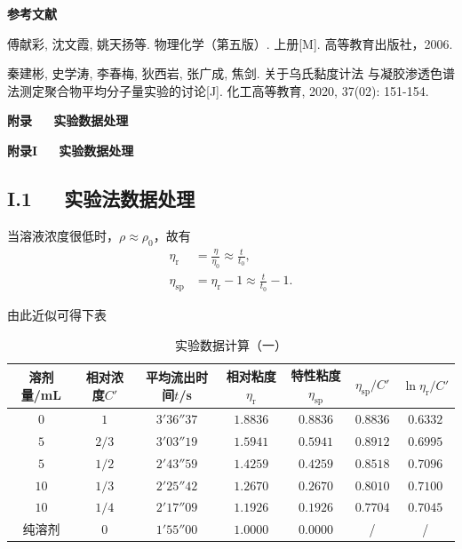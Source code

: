 \documentclass[12pt]{ctexart}
\numberwithin{equation}{section}
\begin{document}
\begin{center}
    \Large\bfseries{参考文献}
\end{center}
\noindent
[1] 傅献彩, 沈文霞, 姚天扬等. 物理化学（第五版）. 上册[M].
高等教育出版社，2006.

\noindent
[2] 秦建彬, 史学涛, 李春梅, 狄西岩, 张广成, 焦剑. 关于乌氏黏度计法
与凝胶渗透色谱法测定聚合物平均分子量实验的讨论[J]. 化工高等教育,
2020, 37(02): 151-154.


\newpage

\begin{center}
    \LARGE\bfseries{附录~~~实验数据处理}
\end{center}
\begin{center}
    \Large\bfseries{附录I~~~实验数据处理}
\end{center}

\subsection*{I.1~~~实验法数据处理}

当溶液浓度很低时，$\rho\approx\rho_0$，故有
\begin{align}
    \eta_\text{r} &= \frac{\eta}{\eta_0}
    \approx \frac{t}{t_0},
    \tag{I.1} \\
    \eta_\text{sp} &= \eta_\text{r} - 1
    \approx \frac{t}{t_0} - 1.
    \tag{I.2}
\end{align}

由此近似可得下表
\begin{longtable}{ccccccc}
    \caption{实验数据计算（一）} \\
    \hline
    溶剂量/mL & 相对浓度$C'$ & 平均流出时间$t$/s & 相对粘度$\eta_\text{r}$ & 特性粘度$\eta_{\text{sp}}$ & $\eta_\text{sp}/C'$ & $\ln\eta_\text{r}/C'$ \\
    \hline
    $0$  & $ 1 $ & $3'36''37$ & $1.8836$ & $0.8836$ & $0.8836$ & $0.6332$ \\
    $5$  & $2/3$ & $3'03''19$ & $1.5941$ & $0.5941$ & $0.8912$ & $0.6995$ \\
    $5$  & $1/2$ & $2'43''59$ & $1.4259$ & $0.4259$ & $0.8518$ & $0.7096$ \\
    $10$ & $1/3$ & $2'25''42$ & $1.2670$ & $0.2670$ & $0.8010$ & $0.7100$ \\
    $10$ & $1/4$ & $2'17''09$ & $1.1926$ & $0.1926$ & $0.7704$ & $0.7045$ \\
    纯溶剂 & $0$ & $1'55''00$ & $1.0000$ & $0.0000$ & / & / \\
    \hline
\end{longtable}
\end{document}
